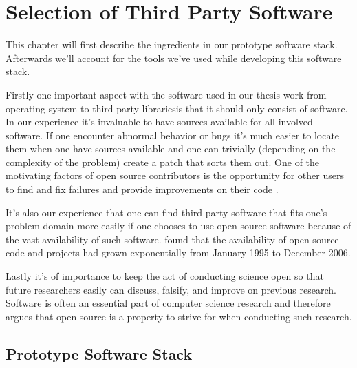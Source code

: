 \chapter{Selection of Third Party Software}
\label{chapter:selection.of.third.party.software}

This chapter will first describe the ingredients in our prototype software
stack. Afterwards we'll account for the tools we've used while developing
this software stack.

Firstly one important aspect with the software used in our thesis work
\dash{}from operating system to third party libraries\dash{}is
that it should only consist of 
software. In our experience it's
invaluable to have sources available for all involved software. If one
encounter abnormal behavior or bugs it's much easier to locate them when one
have sources available and one can trivially (depending on the complexity of
the problem) create a patch that sorts them out. One of the motivating factors
of open source contributors is the opportunity for other users to find and fix
failures and provide improvements on their code \citep[p.~87]{hippel05}.

It's also our experience that one can find third party software that fits
one's problem domain more easily if one chooses to use open source software
because of the vast availability of such software.
\citet{deshpande08} found that the availability of open source
code and projects had grown exponentially from January 1995 to December 2006.

Lastly it's of importance to keep the act of conducting science open so that
future researchers easily can discuss, falsify, and improve on previous
research. Software is often an essential part of computer science research and
\citet[p.~430]{kelty05} therefore argues that open source
is a property to strive for when conducting such research.

\section{Prototype Software Stack}

